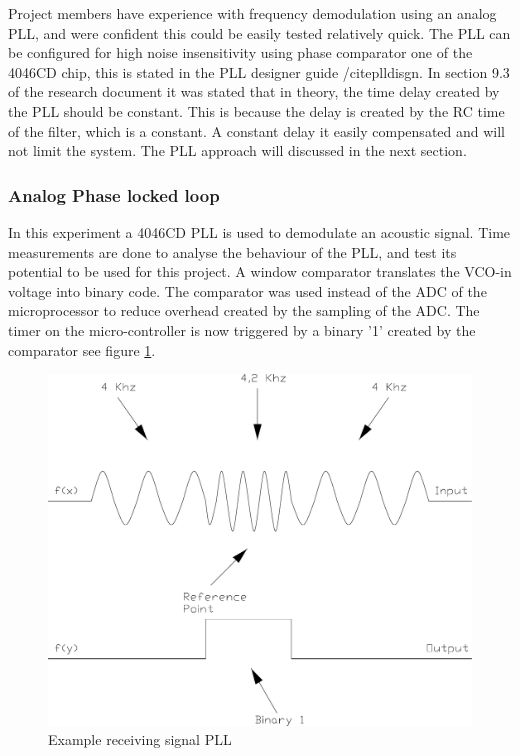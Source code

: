 \documentclass[10pt,a4paper]{article}
\begin{document}
Project members have experience with frequency demodulation using an analog PLL, and were confident this could be easily tested relatively quick. The PLL can be configured for high noise insensitivity using phase comparator one of the 4046CD chip, this is stated in the PLL designer guide /cite{plldisgn}. In section 9.3 of the research document it was stated that in theory, the time delay created by the PLL should be constant. This is because the delay is created by the RC time of the filter, which is a constant. A constant delay it easily compensated and will not limit the system. The PLL approach will discussed in the next section.

\subsubsection{Analog Phase locked loop}
In this experiment a 4046CD PLL is used to demodulate an acoustic signal. Time measurements are done to analyse the behaviour of the PLL, and test its potential to be used for this project. A window comparator translates the VCO-in voltage into binary code. The comparator was used instead of the ADC of the microprocessor to reduce overhead created by the sampling of the ADC. The timer on the micro-controller is now triggered by a binary '1' created by the comparator see figure \ref{fig:pllsignal}.

\begin{figure}[H]
   \centering
   \includegraphics[width=\textwidth]{pllfsk.pdf}
   \caption{Example receiving signal PLL}
   \label{fig:pllsignal}
\end{figure}
\end{document}
